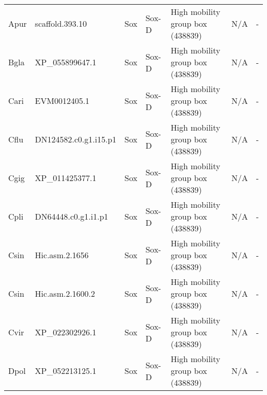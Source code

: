 \documentclass[../main.tex]{subfiles}
\begin{document}
\begin{landscape}
\begin{longtable}{lllllll}
		Apur           & scaffold.393.10       & Sox            & Sox-D               & High mobility group box (438839)            & N/A                                                                    & -                    \\
		Bgla           & XP\_055899647.1       & Sox            & Sox-D               & High mobility group box (438839)            & N/A                                                                    & -                    \\
		Cari           & EVM0012405.1          & Sox            & Sox-D               & High mobility group box (438839)            & N/A                                                                    & -                    \\
		Cflu           & DN124582.c0.g1.i15.p1 & Sox            & Sox-D               & High mobility group box (438839)            & N/A                                                                    & -                    \\
		Cgig           & XP\_011425377.1       & Sox            & Sox-D               & High mobility group box (438839)            & N/A                                                                    & -                    \\
		Cpli           & DN64448.c0.g1.i1.p1   & Sox            & Sox-D               & High mobility group box (438839)            & N/A                                                                    & -                    \\
		Csin           & Hic.asm.2.1656        & Sox            & Sox-D               & High mobility group box (438839)            & N/A                                                                    & -                    \\
		Csin           & Hic.asm.2.1600.2      & Sox            & Sox-D               & High mobility group box (438839)            & N/A                                                                    & -                    \\
		Cvir           & XP\_022302926.1       & Sox            & Sox-D               & High mobility group box (438839)            & N/A                                                                    & -                    \\
		Dpol           & XP\_052213125.1       & Sox            & Sox-D               & High mobility group box (438839)            & N/A                                                                    & -                    \\

\end{longtable}
\end{landscape}
\end{document}
